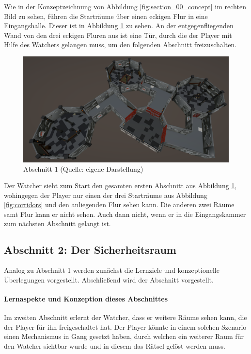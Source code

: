 Wie in der Konzeptzeichnung von Abbildung \ref{fig:section_00_concept} im rechten Bild zu sehen, führen die Starträume über einen eckigen Flur in eine Eingangshalle. Dieser ist in Abbildung \ref{fig:section_00} zu sehen. An der entgegenfliegenden Wand von den drei eckigen Fluren aus ist eine Tür, durch die der Player mit Hilfe des Watchers gelangen muss, um den folgenden Abschnitt freizuschalten. 

\begin{figure}[ht]
\centering
\includegraphics[width=1\linewidth]{content/pictures/Abschnitt_00.PNG}
\caption{Abschnitt 1 (Quelle: eigene Darstellung)}
\label{fig:section_00}
\end{figure}

Der Watcher sieht zum Start den gesamten ersten Abschnitt aus Abbildung \ref{fig:section_00}, wohingegen der Player nur einen der drei Starträume aus Abbildung \ref{fig:corridors} und den anliegenden Flur sehen kann. Die anderen zwei Räume samt Flur kann er nicht sehen. Auch dann nicht, wenn er in die Eingangskammer zum nächsten Abschnitt gelangt ist.


\subsection{Abschnitt 2: Der Sicherheitsraum}
Analog zu Abschnitt 1 werden zunächst die Lernziele und konzeptionelle Überlegungen vorgestellt. Abschließend wird der Abschnitt vorgestellt.

\paragraph{Lernaspekte und Konzeption dieses Abschnittes}
Im zweiten Abschnitt erlernt der Watcher, dass er weitere Räume sehen kann, die der Player für ihn freigeschaltet hat. Der Player könnte in einem solchen Szenario einen Mechanismus in Gang gesetzt haben, durch welchen ein weiterer Raum für den Watcher sichtbar wurde und in diesem das Rätsel gelöst werden muss.

